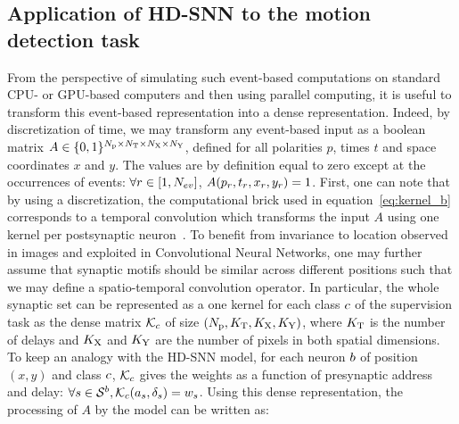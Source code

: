 \documentclass[default]{sn-jnl}%
\theoremstyle{thmstyleone}%
\theoremstyle{thmstyletwo}%
\theoremstyle{thmstylethree}%
\begin{document}
\subsection{Application of HD-SNN to the motion detection task}
%
From the perspective of simulating such event-based computations on standard CPU- or GPU-based computers and then using parallel computing, it is useful to transform this event-based representation into a dense representation. Indeed, by discretization of time, we may transform any event-based input as a boolean matrix $A \in \{0, 1 \}^{N_\text{p} \times N_\text{T} \times N_\text{X} \times N_\text{Y}}$, defined for all polarities $p$, times $t$ and space coordinates $x$ and $y$. The values are by definition equal to zero except at the occurrences of events: $\forall r \in [1,N_{ev}]$, $A(p_r, t_r, x_r, y_r)=1$. First, one can note that by using a discretization, the computational brick used in equation~\eqref{eq:kernel_b} corresponds to a temporal convolution which transforms the input $A$ using one kernel per postsynaptic neuron~\citep{grimaldi_learning_2022}. To benefit from invariance to location observed in images and exploited in Convolutional Neural Networks, one may further assume that synaptic motifs should be similar across different positions such that we may define a spatio-temporal convolution operator. %
In particular, the whole synaptic set can be represented as a one kernel for each class $c$ of the supervision task as the dense matrix $\mathcal{K}_c$ of size $(N_\text{p}, K_\text{T}, K_\text{X}, K_\text{Y})$, where  $K_\text{T}$ is the number of delays and $K_\text{X}$ and $K_\text{Y}$ are the number of pixels in both spatial dimensions. To keep an analogy with the HD-SNN model, for each neuron $b$ of position $(x, y)$ and class $c$, $\mathcal{K}_c$ gives the weights as a function of presynaptic address and delay: $\forall {s\in \mathcal{S}^b}, \mathcal{K}_c(a_s, \delta_s) = w_s$. %
Using this dense representation, the processing of $A$ by the model can be written as:
\end{document}
